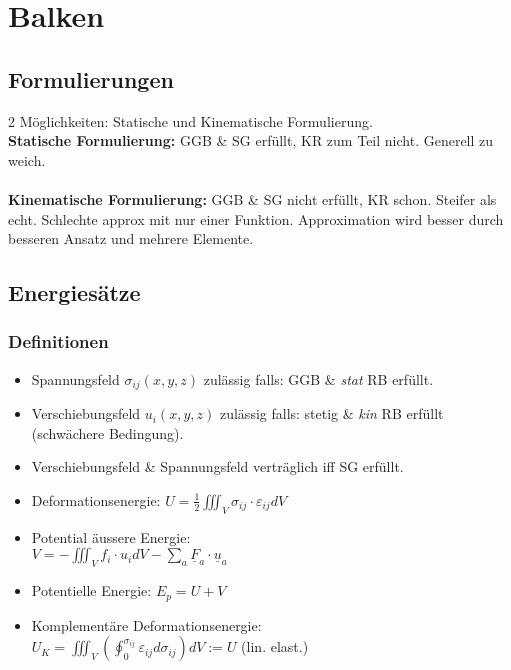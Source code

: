\section{Balken}
    \subsection{Formulierungen}
        2 Möglichkeiten: Statische und Kinematische Formulierung.\\
        \textbf{Statische Formulierung:} GGB \& SG erfüllt, KR zum Teil nicht. Generell zu weich.\\\\
        \textbf{Kinematische Formulierung:} GGB \& SG nicht erfüllt, KR schon. Steifer als echt. Schlechte approx mit nur einer Funktion. Approximation wird besser durch besseren Ansatz und mehrere Elemente.
    \subsection{Energiesätze}
        \subsubsection{Definitionen}
            \begin{itemize}
                \item Spannungsfeld $\sigma_{ij}(x,y,z)$ zulässig falls: GGB \& \textit{stat} RB erfüllt.
                \item Verschiebungsfeld $u_i(x,y,z)$ zulässig falls: stetig \& \textit{kin} RB erfüllt (schwächere Bedingung).
                \item Verschiebungsfeld \& Spannungsfeld verträglich iff SG erfüllt.
                \item Deformationsenergie: $U=\frac{1}{2}\iiint_V \sigma_{ij}\cdot\varepsilon_{ij}dV$
                \item Potential äussere Energie:\\
                $V=-\iiint_V f_i\cdot u_idV-\sum_{a}\underline{F}_a\cdot\underline{u}_a$
                \item Potentielle Energie: $E_p=U+V$
                \item Komplementäre Deformationsenergie:\\ $U_K=\iiint_V(\oint_0^{\sigma_{ij}}\varepsilon_{ij}d\sigma_{ij})dV := U$  (lin. elast.)
            \end{itemize}
            
